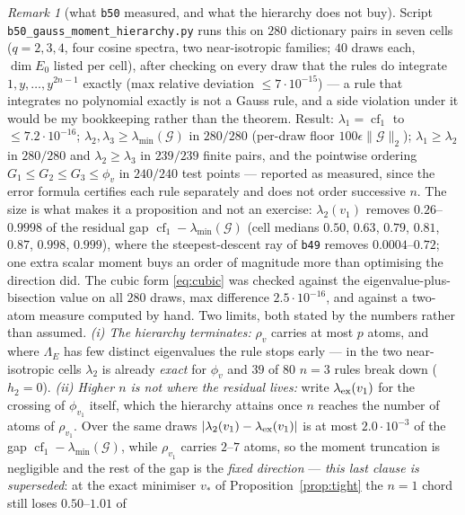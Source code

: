 \documentclass[11pt]{article}
\theoremstyle{remark}
\newtheorem{remark}{Remark}[section]
\newcommand{\Gr}{\mathcal{G}}
\newcommand{\Le}{\Lambda_E}
\begin{document}
\begin{remark}[what \texttt{b50} measured, and what the hierarchy does not buy]
\label{rem:gauss}
Script \texttt{b50\_gauss\_moment\_\allowbreak hierarchy.py} runs this on $280$ dictionary pairs in seven cells
($q=2,3,4$, four cosine spectra, two near-isotropic families; $40$ draws each,
$\operatorname{dim}E_0$ listed
per cell), after checking on every draw that the rules do integrate $1,y,\ldots,y^{2n-1}$ exactly
(max relative deviation $\le7\cdot10^{-15}$) --- a rule that integrates no polynomial exactly is not a
Gauss rule, and a side violation under it would be my bookkeeping rather than the theorem.
Result: $\lambda_1=\operatorname{cf}_1$ to $\le7.2\cdot10^{-16}$; $\lambda_2,\lambda_3\ge
\lambda_{\min}(\Gr)$ in $280/280$ (per-draw floor $100\epsilon\|\Gr\|_2$); $\lambda_1\ge\lambda_2$ in
$280/280$ and $\lambda_2\ge\lambda_3$ in $239/239$ finite pairs, and the pointwise ordering
$G_1\le G_2\le G_3\le\phi_v$ in $240/240$ test points --- reported as measured, since the error
formula certifies each rule separately and does not order successive $n$.
The size is what makes it a proposition and not an exercise: $\lambda_2(v_1)$ removes $0.26$--$0.9998$
of the residual gap $\operatorname{cf}_1-\lambda_{\min}(\Gr)$ (cell medians
$0.50$, $0.63$, $0.79$, $0.81$, $0.87$, $0.998$, $0.999$), where the steepest-descent ray of
\texttt{b49} removes $0.0004$--$0.72$; one extra scalar moment buys an order of magnitude more than
optimising the direction did. The cubic form \eqref{eq:cubic} was checked against the
eigenvalue-plus-bisection value on all $280$ draws, max difference $2.5\cdot10^{-16}$, and against a
two-atom measure computed by hand.
Two limits, both stated by the numbers rather than assumed. \emph{(i) The hierarchy terminates:}
$\rho_v$ carries at most $p$ atoms, and where $\Le$ has few distinct eigenvalues the rule stops
early --- in the two near-isotropic cells $\lambda_2$ is already \emph{exact} for $\phi_v$ and $39$ of
$80$ $n=3$ rules break down ($h_2=0$). \emph{(ii) Higher $n$ is not where the residual lives:} write
$\lambda_{\rm ex}(v_1)$ for the crossing of $\phi_{v_1}$ itself, which the hierarchy attains once $n$
reaches the number of atoms of $\rho_{v_1}$. Over the same
draws $|\lambda_2(v_1)-\lambda_{\rm ex}(v_1)|$ is at most $2.0\cdot10^{-3}$ of the gap
$\operatorname{cf}_1-\lambda_{\min}(\Gr)$, while $\rho_{v_1}$ carries $2$--$7$ atoms, so the moment
truncation is negligible and
the rest of the gap is the \emph{fixed direction} --- \emph{this last clause is superseded}: at the
exact minimiser $v_\ast$ of Proposition~\ref{prop:tight} the $n=1$ chord still loses $0.50$--$1.01$ of

\end{remark}
\end{document}
